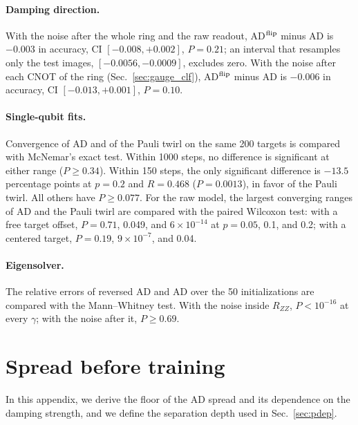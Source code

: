 \documentclass[
 aps,pra,
 twocolumn,
 superscriptaddress,
 longbibliography,
 nofootinbib
]{revtex4-2}
\begin{document}
\paragraph{Damping direction.}
With the noise after the whole ring and the raw readout, AD$^{\rm flip}$ minus AD is
$-0.003$ in accuracy, CI $[-0.008,+0.002]$, $P=0.21$; an interval that
resamples only the test images, $[-0.0056,-0.0009]$, excludes zero. With the
noise after each CNOT of the ring (Sec.~\ref{sec:gauge_clf}), AD$^{\rm flip}$
minus AD is $-0.006$ in accuracy, CI $[-0.013,+0.001]$, $P=0.10$.

\paragraph{Single-qubit fits.}
Convergence of AD and of the Pauli twirl on the same 200 targets is compared
with McNemar's exact test. Within 1000 steps, no difference is significant at
either range ($P\ge0.34$). Within 150 steps, the only significant difference is
$-13.5$ percentage points at $p=0.2$ and $R=0.468$ ($P=0.0013$), in favor of
the Pauli twirl. All others have $P\ge0.077$. For the raw model, the largest converging ranges of AD and
the Pauli twirl are compared with the paired Wilcoxon test: with a free target
offset, $P=0.71$, 0.049, and $6\times10^{-14}$ at $p=0.05$, 0.1, and 0.2; with a
centered target, $P=0.19$, $9\times10^{-7}$, and 0.04.

\paragraph{Eigensolver.}
The relative errors of reversed AD and AD over the 50 initializations are
compared with the Mann--Whitney test. With the noise inside $R_{ZZ}$,
$P<10^{-16}$ at every $\gamma$; with the noise after it, $P\ge0.69$.

\section{Spread before training}
\label{app:width}

In this appendix, we derive the floor of the AD spread and its dependence on
the damping strength, and we define the separation depth used in
Sec.~\ref{sec:pdep}.
\end{document}
